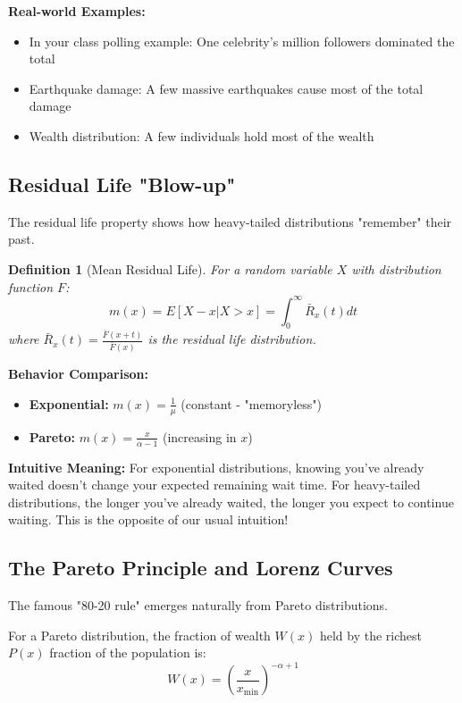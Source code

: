 \documentclass[11pt]{article}
\newtheorem{definition}{Definition}
\begin{document}
\textbf{Real-world Examples:}
\begin{itemize}
\item In your class polling example: One celebrity's million followers dominated the total
\item Earthquake damage: A few massive earthquakes cause most of the total damage
\item Wealth distribution: A few individuals hold most of the wealth
\end{itemize}

\subsection{Residual Life "Blow-up"}

The residual life property shows how heavy-tailed distributions "remember" their past.

\begin{definition}[Mean Residual Life]
For a random variable $X$ with distribution function $F$:
$$m(x) = E[X - x | X > x] = \int_0^{\infty} \bar{R}_x(t) dt$$
where $\bar{R}_x(t) = \frac{\bar{F}(x+t)}{\bar{F}(x)}$ is the residual life distribution.
\end{definition}

\textbf{Behavior Comparison:}
\begin{itemize}
\item \textbf{Exponential:} $m(x) = \frac{1}{\mu}$ (constant - "memoryless")
\item \textbf{Pareto:} $m(x) = \frac{x}{\alpha-1}$ (increasing in $x$)
\end{itemize}

\textbf{Intuitive Meaning:} For exponential distributions, knowing you've already waited doesn't change your expected remaining wait time. For heavy-tailed distributions, the longer you've already waited, the longer you expect to continue waiting. This is the opposite of our usual intuition!

\subsection{The Pareto Principle and Lorenz Curves}

The famous "80-20 rule" emerges naturally from Pareto distributions.

For a Pareto distribution, the fraction of wealth $W(x)$ held by the richest $P(x)$ fraction of the population is:
$$W(x) = \left(\frac{x}{x_{\min}}\right)^{-\alpha+1}$$
\end{document}
